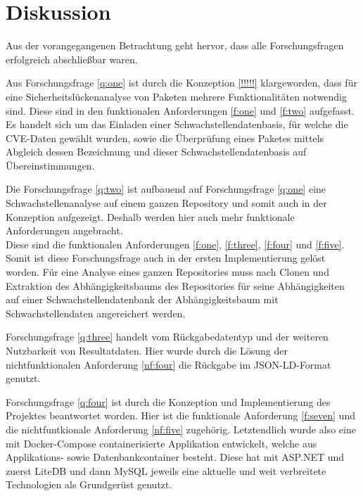 \section{Diskussion} \label{sec:Diskussion}
    Aus der vorangegangenen Betrachtung geht hervor, dass alle Forschungsfragen erfolgreich abschließbar waren.

    Aus Forschungsfrage \ref{q:one} ist durch die Konzeption \ref{!!!!!} klargeworden, dass für eine Sicherheitslückenanalyse von Paketen mehrere Funktionalitäten notwendig sind.
    Diese sind in den funktionalen Anforderungen \ref{f:one} und \ref{f:two} aufgefasst.
    Es handelt sich um das Einladen einer Schwachstellendatenbasis, für welche die \ac{CVE}-Daten gewählt wurden, sowie die Überprüfung eines Paketes mittels Abgleich dessen Bezeichnung und dieser Schwachstellendatenbasis auf Übereinstimmungen.

    Die Forschungsfrage \ref{q:two} ist aufbauend auf Forschungsfrage \ref{q:one} eine Schwachstellenanalyse auf einem ganzen Repository und somit auch in der Konzeption aufgezeigt.
    Deshalb werden hier auch mehr funktionale Anforderungen angebracht.
    \\
    Diese sind die funktionalen Anforderungen \ref{f:one}, \ref{f:three}, \ref{f:four} und \ref{f:five}.
    Somit ist diese Forschungsfrage auch in der ersten Implementierung gelöst worden.
    Für eine Analyse eines ganzen Repositories muss nach Clonen und Extraktion des Abhängigkeitsbaums des Repositories für seine Abhängigkeiten auf einer Schwachstellendatenbank der Abhängigkeitsbaum mit Schwachstellendaten angereichert werden.

    Forschungsfrage \ref{q:three} handelt vom Rückgabedatentyp und der weiteren Nutzbarkeit von Resultatdaten.
    Hier wurde durch die Lösung der nichtfunktionalen Anforderung \ref{nf:four} die Rückgabe im JSON-LD-Format genutzt.

    Forschungsfrage \ref{q:four} ist durch die Konzeption und Implementierung des Projektes beantwortet worden.
    Hier ist die funktionale Anforderung \ref{f:seven} und die nichtfuntkionale Anforderung \ref{nf:five} zugehörig.
    Letztendlich wurde also eine mit Docker-Compose containerisierte Applikation entwickelt, welche aus Applikations- sowie Datenbankcontainer besteht.
    Diese hat mit ASP.NET und zuerst LiteDB und dann MySQL jeweils eine aktuelle und weit verbreitete Technologien als Grundgerüst genutzt.

